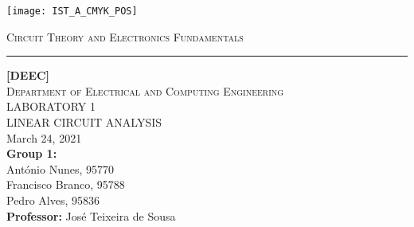 \thispagestyle {empty}

\begin{titlepage}

\texttt{[image: IST\_A\_CMYK\_POS]} \\[1cm]

\centering

\textsc{\large{Circuit Theory and Electronics Fundamentals}} \\[0.25cm]
\hrule
\vspace{1.75cm}

\textsc{\textbf {[DEEC]}} \\[0.5cm]
\textsc{Department of Electrical and Computing Engineering} \\[3.25cm]
\MakeUppercase{\Huge Laboratory 1} \\[0.75cm]
\MakeUppercase{\huge Linear Circuit Analysis} \\[3.5cm]
March 24, 2021 \\[2.5cm]
\textbf{Group 1:} \\[0.5cm]
António Nunes, 95770 \\
Francisco Branco, 95788 \\
Pedro Alves, 95836 \\[2cm]
\textbf{Professor:} José Teixeira de Sousa 
\end{titlepage}
